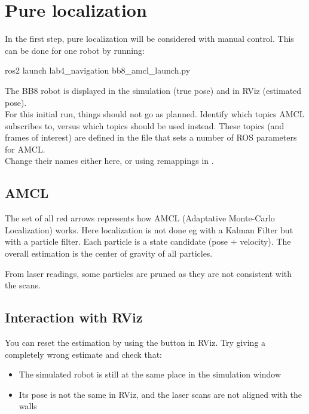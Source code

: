 \documentclass{ecnreport}
\begin{document}
\newpage

\section{Pure localization}

In the first step, pure localization will be considered with manual control. This can be done for one robot by running:
\begin{bashcodelarge}
 ros2 launch lab4_navigation bb8_amcl_launch.py
\end{bashcodelarge}
The BB8 robot is displayed in the simulation (true pose) and in RViz (estimated pose).\\

For this initial run, things should not go as planned. Identify which topics AMCL subscribes to, versus which topics should be used instead. These topics (and frames of interest) are defined in the file  that sets a number of ROS parameters for AMCL. \\Change their names either here, or using remappings in .

\subsection{AMCL}

The set of all red arrows represents how AMCL (Adaptative Monte-Carlo Localization) works. Here localization is not done eg with a Kalman Filter but with a particle filter. Each particle is a state candidate (pose + velocity). The overall estimation is the center of gravity of all particles.

From laser readings, some particles are pruned as they are not consistent with the scans.

\subsection{Interaction with RViz}

You can reset the estimation by using the  button in RViz. Try giving a completely wrong estimate and check that:
\begin{itemize}
 \item The simulated robot is still at the same place in the simulation window
 \item Its pose is not the same in RViz, and the laser scans are not aligned with the walls
\end{itemize}
\end{document}
